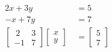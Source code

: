 \documentclass[12 pt]{slides}
\begin{document}
\begin{align*}
	2x + 3y &= 5\\
	-x + 7y &= 7\\
	\begin{bmatrix}\ 2 & 3\\-1 & 7\end{bmatrix} \begin{bmatrix}x \\ y\end{bmatrix}\ &=
\begin{bmatrix}5\\7\end{bmatrix}
\end{align*}
\end{document}
